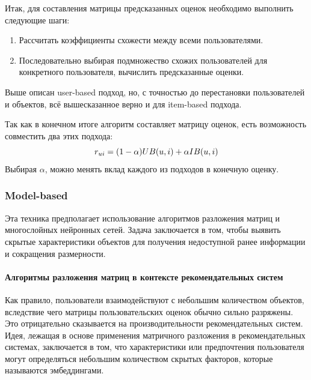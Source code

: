 Итак, для составления матрицы предсказанных оценок необходимо выполнить следующие шаги:
\begin{enumerate}
\item Рассчитать коэффициенты схожести между всеми пользователями.
\item Последовательно выбирая подмножество схожих пользователей для конкретного пользователя, вычислить предсказанные оценки.
\end{enumerate}
Выше описан user-based подход, но, с точностью до перестановки пользователей и объектов, всё вышесказанное верно и для item-based подхода.

Так как в конечном итоге алгоритм составляет матрицу оценок, есть возможность совместить два этих подхода:
\begin{equation}\label{eq:memory_hybrid2}
r_{ui} = (1 - \alpha)\space UB(u, i) + \alpha\space IB(u,i)
\end{equation}
Выбирая $\alpha$, можно менять вклад каждого из подходов в конечную оценку.

\subsubsection{Model-based}
Эта техника предполагает использование алгоритмов разложения матриц и многослойных нейронных сетей.
Задача заключается в том, чтобы выявить скрытые характеристики объектов для получения недоступной ранее информации и сокращения размерности.

\paragraph{Алгоритмы разложения матриц в контексте рекомендательных систем}

Как правило, пользователи взаимодействуют с небольшим количеством объектов, вследствие чего матрицы пользовательских оценок обычно сильно разряжены.
Это отрицательно сказывается на производительности рекомендательных систем.
Идея, лежащая в основе применения матричного разложения в рекомендательных системах, заключается в том, что характеристики или предпочтения пользователя могут определяться небольшим количеством скрытых факторов, которые называются эмбеддингами.

